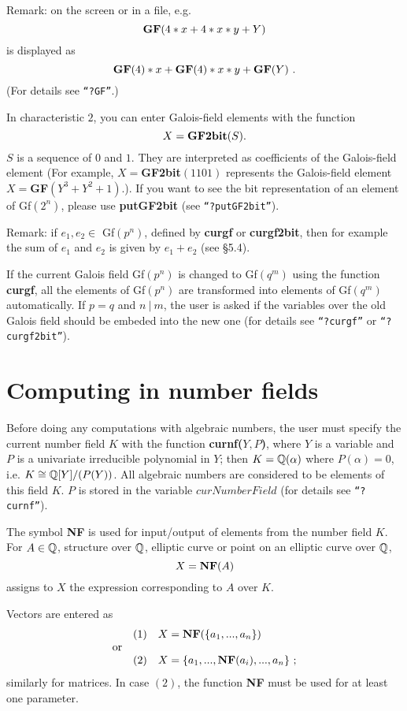 Remark: on the screen or in a file, e.g.
$$
\mbox{\bf GF}(4 * x + 4 * x * y + Y)
$$
is displayed as
$$
\mbox{\bf GF}(4) * x + \mbox{\bf GF}(4) * x * y + \mbox{\bf GF}(Y)\ .
$$
(For details see {\tt ``?GF''}.)

In characteristic $2$, you can enter Galois-field elements with the function
$$
X = \mbox{\bf GF2bit}(S).
$$
$S$ is a sequence of $0$ and $1$. They are interpreted as coefficients of the
Galois-field element (For example, $X=${\bf GF2bit}$(1101)$ represents the 
Galois-field element $X=${\bf GF}$(Y^3+Y^2+1)$.). If you want to see the bit
representation of an element of Gf$(2^n)$, please use {\bf putGF2bit} (see 
{\tt ``?putGF2bit''}).

Remark: if $e_1, e_2 \in$ Gf$(p^n)$, defined by {\bf curgf} or {\bf curgf2bit}, 
then for example the sum of $e_1$ and $e_2$ is given by $e_1 + e_2$ 
(see \S 5.4).

If the current Galois field Gf$(p^n)$ is changed to Gf$(q^m)$ using the function
{\bf curgf}, all the elements of Gf$(p^n)$ are transformed into elements of Gf$(q^m)$
automatically. If $p = q$ and $n\ |\ m$, the user is asked if the variables over the old
Galois field should be embeded into the new one (for details see {\tt ``?curgf''} or {\tt ``?curgf2bit''}).


\section{Computing in number fields}
Before doing any computations with algebraic numbers, the user must specify the current
number field $K$ with the function {\bf curnf($Y,P$)}, where $Y$ is a variable and
$P$ is a univariate irreducible polynomial in $Y$; then $K=\mbox{$\mathbb Q$} (\alpha )$ where
$P(\alpha ) = 0$, i.e.\/ $K \cong \mbox{$\mathbb Q$} [Y]/(P(Y))$. All algebraic numbers are considered
to be elements of this field $K$. $P$ is stored in the variable $curNumberField$
(for details see {\tt ``?curnf''}).

The symbol {\bf NF} is used for input/output of elements from the number field $K$.
For $A \in \mbox{$\mathbb Q$}$, structure over $\mbox{$\mathbb Q$}$, elliptic curve or point on an elliptic curve over $\mbox{$\mathbb Q$}$,
$$
X = \mbox{\bf NF}(A)
$$
assigns to $X$ the expression corresponding to $A$ over $K$.

Vectors are entered as
$$\begin{array}{lrl}
 & (1) & X = \mbox{\bf NF}(\{ a_1,...,a_n\} ) \\
\mbox{or} & & \\
 & (2) & X = \{ a_1,...,\mbox{\bf NF}(a_i),...,a_n\}\ ;
\end{array}$$
similarly for matrices. In case $(2)$, the function {\bf NF} must be used for at least
one parameter.

